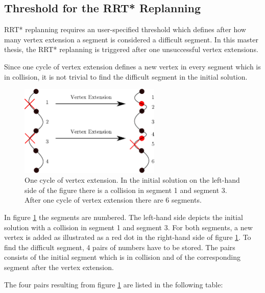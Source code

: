 \subsection{Threshold for the RRT* Replanning}\label{sec:RRTreplanning}

RRT* replanning requires an user-specified threshold which defines after how many vertex extension a segment is considered a difficult segment. In this master thesis, the RRT* replanning is triggered after one unsuccessful vertex extensions.\newline

Since one cycle of vertex extension defines a new vertex in every segment which is in collision, it is not trivial to find the difficult segment in the initial solution.

\begin{figure}[H]
   \centering
   \includegraphics[width=0.6\textwidth]{pics/recogniseSegment2.eps}
   \caption{One cycle of vertex extension. In the initial solution on the left-hand side of the figure there is a collision in segment 1 and segment 3. After one cycle of vertex extension there are 6 segments. }
   \label{pic:recognise}
\end{figure}

In figure \ref{pic:recognise} the segments are numbered. The left-hand side depicts the initial solution with a collision in segment 1 and segment 3. For both segments, a new vertex is added as illustrated as a red dot in the right-hand side of figure \ref{pic:recognise}. To find the difficult segment, 4 pairs of numbers have to be stored. The pairs consists of the initial segment which is in collision and of the corresponding segment after the vertex extension. \newline

The four pairs resulting from figure \ref{pic:recognise} are listed in the following table:

